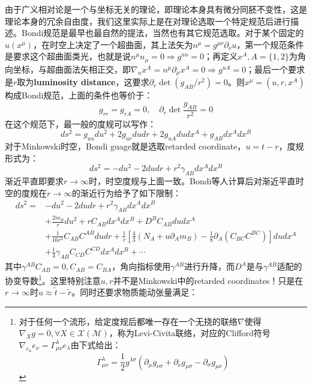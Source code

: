 由于广义相对论是一个与坐标无关的理论，即理论本身具有微分同胚不变性，这是理论本身的冗余自由度，我们这里实际上是在对理论选取一个特定规范后进行描述。Bondi规范是最早也最自然的提法，当然也有其它规范选取\cite{Campiglia:2015kxa,Campiglia:2015lxa}。对于某个固定的$u(x^\mu)$，在时空上决定了一个超曲面，其上法矢为$n^\mu=g^{\mu\nu}\partial_\nu u$，第一个规范条件是要求这个超曲面类光，也就是说$n^\mu n_\mu=0\Rightarrow g^{uu}=0$；再定义$x^A,A=\{1,2\}$为角向坐标，与超曲面法矢相正交，即$\nabla_n x^A=n^\mu\partial_\mu x^A=0\Rightarrow g^{uA}=0$；最后一个要求是$r$取为\textbf{luminosity distance}，这要求$\partial_r \det (g_{AB}/r^2)=0$。则$x^\mu=(u,r,x^A)$构成Bondi规范，上面的条件也等价于：
\begin{equation}
	g_{rr}=g_{rA}=0,\quad \partial_r\det\frac{g_{AB}}{r^2}=0
\end{equation}
在这个规范下，最一般的度规可以写作：
\begin{equation}
	ds^2=g_{uu}du^2+2g_{ur}dudr+2g_{uA}dudx^A+g_{AB}dx^Adx^B
\end{equation}
对于Minkowski时空，Bondi guage就是选取retarded coordinate，$u=t-r$，度规形式为：
\begin{equation}
	ds^2=-du^2-2dudr+r^2\gamma_{AB}dx^Adx^B
\end{equation}
渐近平直即要求$r\to\infty$时，时空度规与上面一致。Bondi等人计算后对渐近平直时空的度规在$r\to\infty$的渐近行为给予了如下限制\cite{Bondi:1962px,Sachs:1962wk}：
\begin{equation}\label{eq:17.4}
	\begin{aligned}
		ds^2=&-du^2-2dudr+r^2\gamma_{AB}dx^Adx^B\\
		&+\frac{2m_B}{r}du^2+rC_{AB}dx^Adx^B+D^B C_{AB}dudx^A\\
		&+\frac{1}{16r^2}C_{AB}C^{AB}dudr+\frac{1}{r}\left[\frac{4}{3}\left(N_A+u\partial_Am_B\right)-\frac{1}{8}\partial_A\left(C_{BC}C^{BC}\right)\right]dudx^A\\
		&+\frac{1}{4}\gamma_{AB}C_{CD}C^{CD}dx^Adx^B+\cdots
	\end{aligned}
\end{equation}
其中$\gamma^{AB}C_{AB}=0,C_{AB}=C_{BA}$，角向指标使用$\gamma^{AB}$进行升降，而$D^A$是与$\gamma^{AB}$适配的协变导数\footnote{对于任何一个流形，给定度规后都唯一存在一个无挠的联络$\nabla$使得$\nabla_X g=0,\forall X\in\mathscr{X}(\mathcal{M})$，称为Levi-Civita联络，对应的Clifford符号$\nabla_{e_\mu}e_\nu=\Gamma_{\mu\nu}^{\lambda}e_\lambda$由下式给出：
\[\Gamma^\lambda_{\mu\nu}=\frac{1}{2}g^{\lambda\sigma}\left(\partial_\mu g_{\nu\sigma}+\partial_\nu g_{\mu\sigma}-\partial_\sigma g_{\mu\nu}\right)\]}。这里特别注意$u,r$并不是Minkowski中的retarded coordinates！只是在$r\to\infty$时$u\approx \tilde t-\tilde r$。同时还要求物质能动张量满足：
